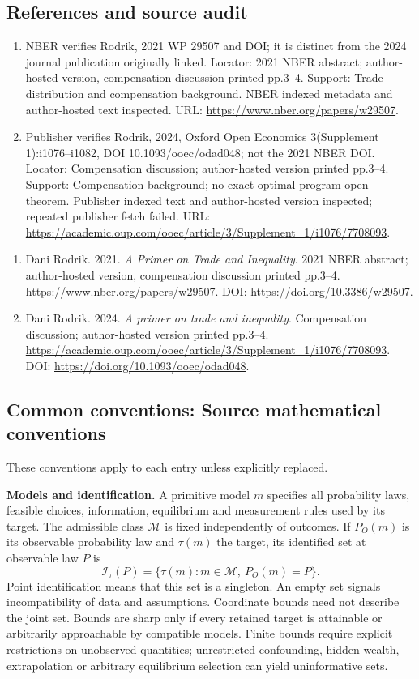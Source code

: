 \documentclass[11pt,a4paper]{article}
\begin{document}
\subsection*{References and source audit}
\begin{enumerate}
\item NBER verifies Rodrik, 2021 WP 29507 and DOI; it is distinct from the 2024 journal publication originally linked. Locator: 2021 NBER abstract; author-hosted version, compensation discussion printed pp.3--4. Support: Trade-distribution and compensation background. NBER indexed metadata and author-hosted text inspected. URL: \url{https://www.nber.org/papers/w29507}.
\item Publisher verifies Rodrik, 2024, Oxford Open Economics 3(Supplement 1):i1076--i1082, DOI 10.1093/ooec/odad048; not the 2021 NBER DOI. Locator: Compensation discussion; author-hosted version printed pp.3--4. Support: Compensation background; no exact optimal-program open theorem. Publisher indexed text and author-hosted version inspected; repeated publisher fetch failed. URL: \url{https://academic.oup.com/ooec/article/3/Supplement_1/i1076/7708093}.
\end{enumerate}
\begin{enumerate}\raggedright
\item\hypertarget{definitions:source:30007622:1}{} Dani Rodrik. 2021. \emph{A Primer on Trade and Inequality}. 2021 NBER abstract; author-hosted version, compensation discussion printed pp.3--4.
\url{https://www.nber.org/papers/w29507}.
DOI: \url{https://doi.org/10.3386/w29507}.
\item\hypertarget{definitions:source:30007622:2}{} Dani Rodrik. 2024. \emph{A primer on trade and inequality}. Compensation discussion; author-hosted version printed pp.3--4.
\url{https://academic.oup.com/ooec/article/3/Supplement_1/i1076/7708093}.
DOI: \url{https://doi.org/10.1093/ooec/odad048}.
\end{enumerate}

\subsection*{Common conventions: Source mathematical conventions}

These conventions apply to each entry unless explicitly replaced.

\textbf{Models and identification.} A primitive model \(m\) specifies all probability laws, feasible choices, information, equilibrium and measurement rules used by its target. The admissible class \(\mathcal M\) is fixed independently of outcomes. If \(P_O(m)\) is its observable probability law and \(\tau(m)\) the target, its identified set at observable law \(P\) is
\[
 \mathcal I_\tau(P)=\{\tau(m):m\in\mathcal M,\ P_O(m)=P\}.
\]
Point identification means that this set is a singleton. An empty set signals incompatibility of data and assumptions. Coordinate bounds need not describe the joint set. Bounds are sharp only if every retained target is attainable or arbitrarily approachable by compatible models. Finite bounds require explicit restrictions on unobserved quantities; unrestricted confounding, hidden wealth, extrapolation or arbitrary equilibrium selection can yield uninformative sets.
\end{document}
